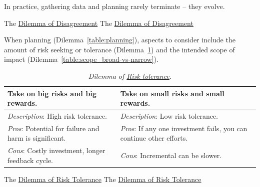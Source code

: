 In practice, gathering data and planning rarely terminate -- they evolve.

The \href{table:opposition}{Dilemma of Disagreement}
The \href{table:opposition}{Dilemma of Disagreement}



When planning (Dilemma~\ref{table:planning}), aspects to consider include
the amount of risk seeking or tolerance (Dilemma~\ref{table:risk})
and
the intended scope of impact  (Dilemma~\ref{table:scope_broad-vs-narrow}).

\begin{center}
\begin{table}[H] %
\begin{tabular}{ | m{\dilemmatablewidth}| m{\dilemmatablewidth} | } 
  \hline
  \textbf{Take on big risks and big rewards.} & 
  \textbf{Take on small risks and small rewards.} \\ 
  \hline
  \textit{Description}: High risk tolerance. &
  \textit{Description}: Low risk tolerance. \\
  \hline
  \textit{Pros}: Potential for failure and harm is significant. &
  \textit{Pros}: If any one investment fails, you can continue other efforts. \\
  \hline
  \textit{Cons}: Costly investment, longer feedback cycle. & 
  \textit{Cons}: Incremental can be slower. \\
  \hline
\end{tabular}
\caption{
\textit{Dilemma of \href{https://en.wikipedia.org/wiki/Risk_assessment}{Risk tolerance}.} 
}
\label{table:risk}
\end{table}
\end{center}

The \href{table:risk}{Dilemma of Risk Tolerance}
The \href{table:risk}{Dilemma of Risk Tolerance}


